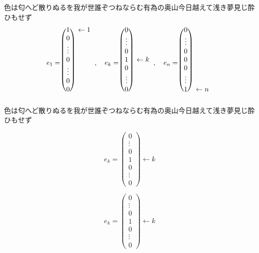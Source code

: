 \documentclass{jarticle}
\begin{document}
色は匂へど散りぬるを我が世誰ぞつねならむ有為の奥山今日越えて浅き夢見じ酔ひもせず
$$
e_1=\begin{blockarray}{*{2}{c}}
\begin{block}{(c)c}
1& \leftarrow 1\\
0&\\
\vdots&\\
0&\\
\vdots &\\
0&\\
0&\\
\end{block}
\end{blockarray},\quad
e_k=\begin{blockarray}{*{2}{c}}
\begin{block}{(c)c}
0&\\
\vdots&\\
0&\\
1& \leftarrow k\\
0&\\
\vdots &\\
0&\\
\end{block}
\end{blockarray},\quad
e_n=\begin{blockarray}{*{2}{c}}
\begin{block}{(c)c}
0&\\
\vdots&\\
0&\\
0&\\
0&\\
\vdots &\\
1& \leftarrow n\\
\end{block}
\end{blockarray}
$$
色は匂へど散りぬるを我が世誰ぞつねならむ有為の奥山今日越えて浅き夢見じ酔ひもせず

$$
e_k=\begin{pmatrix}
0\\ \vdots\\ 0\\ 1\\ 0\\ \vdots\\ 0
\end{pmatrix}
\leftarrow k
$$

$$
e_k=\left(\begin{array}{c}
0\\ \vdots\\ 0\\ 1\\ 0\\ \vdots\\ 0
\end{array}\right)
\leftarrow k
$$
\end{document}
